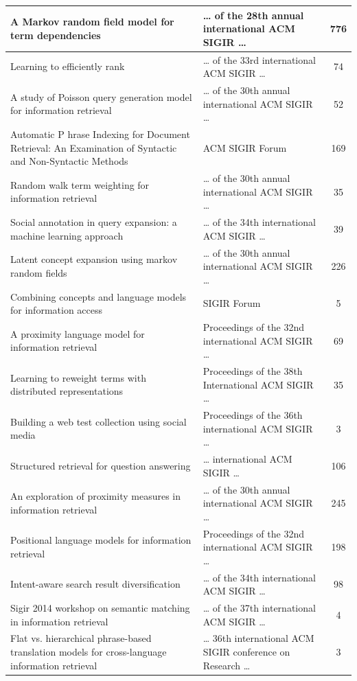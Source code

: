 \documentclass[letterpaper,12pt]{article}
\begin{document}
\begin{longtable}{|p{9cm}|p{5cm}|c|}
A Markov random field model for term dependencies & … of the 28th annual international ACM SIGIR … & 776  \\ \hline
Learning to efficiently rank & … of the 33rd international ACM SIGIR … & 74  \\ \hline
A study of Poisson query generation model for information retrieval & … of the 30th annual international ACM SIGIR … & 52  \\ \hline
Automatic P hrase Indexing for Document Retrieval: An Examination of Syntactic and Non-Syntactic Methods & ACM SIGIR Forum & 169  \\ \hline
Random walk term weighting for information retrieval & … of the 30th annual international ACM SIGIR … & 35  \\ \hline
Social annotation in query expansion: a machine learning approach & … of the 34th international ACM SIGIR … & 39  \\ \hline
Latent concept expansion using markov random fields & … of the 30th annual international ACM SIGIR … & 226  \\ \hline
Combining concepts and language models for information access & SIGIR Forum & 5  \\ \hline
A proximity language model for information retrieval & Proceedings of the 32nd international ACM SIGIR … & 69  \\ \hline
Learning to reweight terms with distributed representations & Proceedings of the 38th International ACM SIGIR … & 35  \\ \hline
Building a web test collection using social media & Proceedings of the 36th international ACM SIGIR … & 3  \\ \hline
Structured retrieval for question answering & … international ACM SIGIR … & 106  \\ \hline
An exploration of proximity measures in information retrieval & … of the 30th annual international ACM SIGIR … & 245  \\ \hline
Positional language models for information retrieval & Proceedings of the 32nd international ACM SIGIR … & 198  \\ \hline
Intent-aware search result diversification & … of the 34th international ACM SIGIR … & 98  \\ \hline
Sigir 2014 workshop on semantic matching in information retrieval & … of the 37th international ACM SIGIR … & 4  \\ \hline
Flat vs. hierarchical phrase-based translation models for cross-language information retrieval & … 36th international ACM SIGIR conference on Research … & 3  \\ \hline

\end{longtable}
\end{document}
